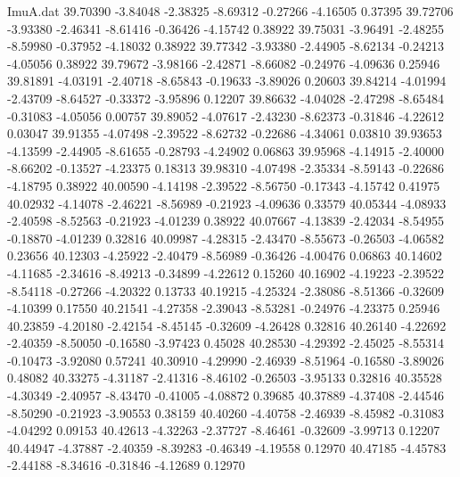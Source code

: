 \begin{filecontents}{ImuA.dat}
  39.70390   -3.84048   -2.38325   -8.69312   -0.27266   -4.16505    0.37395
  39.72706   -3.93380   -2.46341   -8.61416   -0.36426   -4.15742    0.38922
  39.75031   -3.96491   -2.48255   -8.59980   -0.37952   -4.18032    0.38922
  39.77342   -3.93380   -2.44905   -8.62134   -0.24213   -4.05056    0.38922
  39.79672   -3.98166   -2.42871   -8.66082   -0.24976   -4.09636    0.25946
  39.81891   -4.03191   -2.40718   -8.65843   -0.19633   -3.89026    0.20603
  39.84214   -4.01994   -2.43709   -8.64527   -0.33372   -3.95896    0.12207
  39.86632   -4.04028   -2.47298   -8.65484   -0.31083   -4.05056    0.00757
  39.89052   -4.07617   -2.43230   -8.62373   -0.31846   -4.22612    0.03047
  39.91355   -4.07498   -2.39522   -8.62732   -0.22686   -4.34061    0.03810
  39.93653   -4.13599   -2.44905   -8.61655   -0.28793   -4.24902    0.06863
  39.95968   -4.14915   -2.40000   -8.66202   -0.13527   -4.23375    0.18313
  39.98310   -4.07498   -2.35334   -8.59143   -0.22686   -4.18795    0.38922
  40.00590   -4.14198   -2.39522   -8.56750   -0.17343   -4.15742    0.41975
  40.02932   -4.14078   -2.46221   -8.56989   -0.21923   -4.09636    0.33579
  40.05344   -4.08933   -2.40598   -8.52563   -0.21923   -4.01239    0.38922
  40.07667   -4.13839   -2.42034   -8.54955   -0.18870   -4.01239    0.32816
  40.09987   -4.28315   -2.43470   -8.55673   -0.26503   -4.06582    0.23656
  40.12303   -4.25922   -2.40479   -8.56989   -0.36426   -4.00476    0.06863
  40.14602   -4.11685   -2.34616   -8.49213   -0.34899   -4.22612    0.15260
  40.16902   -4.19223   -2.39522   -8.54118   -0.27266   -4.20322    0.13733
  40.19215   -4.25324   -2.38086   -8.51366   -0.32609   -4.10399    0.17550
  40.21541   -4.27358   -2.39043   -8.53281   -0.24976   -4.23375    0.25946
  40.23859   -4.20180   -2.42154   -8.45145   -0.32609   -4.26428    0.32816
  40.26140   -4.22692   -2.40359   -8.50050   -0.16580   -3.97423    0.45028
  40.28530   -4.29392   -2.45025   -8.55314   -0.10473   -3.92080    0.57241
  40.30910   -4.29990   -2.46939   -8.51964   -0.16580   -3.89026    0.48082
  40.33275   -4.31187   -2.41316   -8.46102   -0.26503   -3.95133    0.32816
  40.35528   -4.30349   -2.40957   -8.43470   -0.41005   -4.08872    0.39685
  40.37889   -4.37408   -2.44546   -8.50290   -0.21923   -3.90553    0.38159
  40.40260   -4.40758   -2.46939   -8.45982   -0.31083   -4.04292    0.09153
  40.42613   -4.32263   -2.37727   -8.46461   -0.32609   -3.99713    0.12207
  40.44947   -4.37887   -2.40359   -8.39283   -0.46349   -4.19558    0.12970
  40.47185   -4.45783   -2.44188   -8.34616   -0.31846   -4.12689    0.12970

\end{filecontents}
